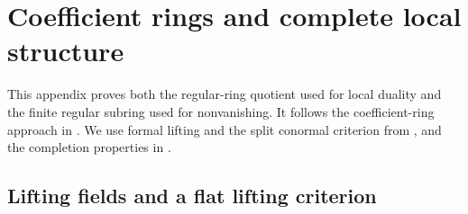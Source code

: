 \chapter{Coefficient rings and complete local structure}
\label{ch:coefficient-rings}
\renewcommand{\chaptermark}[1]{\markboth{\thechapter.\ #1}{}}

This appendix proves both the regular-ring quotient used for local
duality and the finite regular subring used for nonvanishing. It follows
the coefficient-ring approach in \cite[\S160]{st-alg}. We use
formal lifting and the split conormal criterion from
\cite[FL-01, FL-02, FL-07 and KD-17]{core}, and the completion
properties in \cite[ALG-05-C04-R02--R04 and S01]{p103}.

\section{Lifting fields and a flat lifting criterion}

